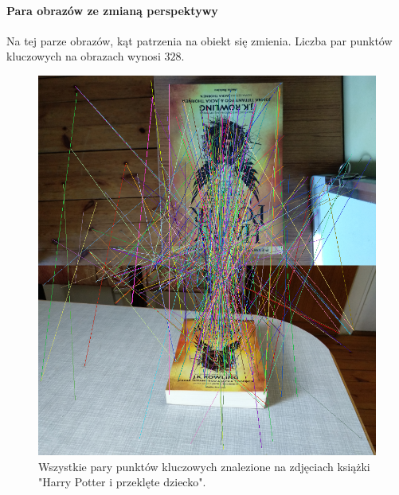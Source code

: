 \documentclass{article}
\begin{document}
	\paragraph{Para obrazów ze zmianą perspektywy}
	Na tej parze obrazów, kąt patrzenia na obiekt się zmienia. Liczba par punktów kluczowych na obrazach wynosi $328$.
	\begin{figure}[H]
		\centering
		\includegraphics[width=0.6\linewidth]{all2trans.png}
		\caption{Wszystkie pary punktów kluczowych znalezione na zdjęciach książki "Harry Potter i przeklęte dziecko".}
	\end{figure}
\end{document}
